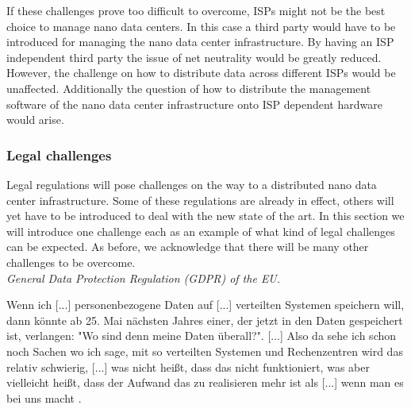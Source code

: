 
If these challenges prove too difficult to overcome, ISPs might not be the best choice to manage nano data centers. In this case a third party would have to be introduced for managing the nano data center infrastructure. By having an ISP independent third party the issue of net neutrality would be greatly reduced. However, the challenge on how to distribute data across different ISPs would be unaffected. Additionally the question of how to distribute the management software of the nano data center infrastructure onto ISP dependent hardware would arise. 


\subsubsection{Legal challenges}
Legal regulations will pose challenges on the way to a distributed nano data center infrastructure. Some of these regulations are already in effect, others will yet have to be introduced to deal with the new state of the art. In this section we will introduce one challenge each as an example of what kind of legal challenges can be expected. As before, we acknowledge that there will be many other challenges to be overcome.\\

\textit{General Data Protection Regulation (GDPR) of the EU.}
\begin{displayquote}
Wenn ich [...] personenbezogene Daten auf [...] verteilten Systemen speichern will, dann könnte ab 25. Mai nächsten Jahres einer, der jetzt in den Daten gespeichert ist, verlangen: "Wo sind denn meine Daten überall?". [...] Also da sehe ich schon noch Sachen wo ich sage, mit so verteilten Systemen und Rechenzentren wird das relativ schwierig, [...] was nicht heißt, dass das nicht funktioniert, was aber vielleicht heißt, dass der Aufwand das zu realisieren mehr ist als [...] wenn man es bei uns macht \cite{kranzlm}.
\end{displayquote}


